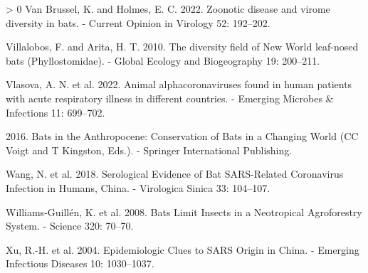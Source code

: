 \documentclass[11pt]{article}
\newlength{\cslhangindent}
\newenvironment{CSLReferences}[3] %
 {%
  \setlength{\parindent}{0pt}
  \ifodd #1 \everypar{\setlength{\hangindent}{\cslhangindent}}\ignorespaces\fi
  \ifnum #2 > 0
  \setlength{\parskip}{#2\baselineskip}
  \fi
 }%
 {}
\begin{document}
\begin{CSLReferences}{1}{0}
\leavevmode\hypertarget{ref-VanBrussel2022ZooDis}{}%
Van Brussel, K. and Holmes, E. C. 2022. Zoonotic disease and virome
diversity in bats. - Current Opinion in Virology 52: 192--202.

\leavevmode\hypertarget{ref-Villalobos2010DivFie}{}%
Villalobos, F. and Arita, H. T. 2010. The diversity field of New World
leaf-nosed bats (Phyllostomidae). - Global Ecology and Biogeography 19:
200--211.

\leavevmode\hypertarget{ref-Vlasova2022AniAlp}{}%
Vlasova, A. N. et al. 2022. Animal alphacoronaviruses found in human
patients with acute respiratory illness in different countries. -
Emerging Microbes \& Infections 11: 699--702.

\leavevmode\hypertarget{ref-Voigt2016BatAnt}{}%
2016. Bats in the Anthropocene: Conservation of Bats in a Changing World
(CC Voigt and T Kingston, Eds.). - Springer International Publishing.

\leavevmode\hypertarget{ref-Wang2018SerEvi}{}%
Wang, N. et al. 2018. Serological Evidence of Bat SARS-Related
Coronavirus Infection in Humans, China. - Virologica Sinica 33:
104--107.

\leavevmode\hypertarget{ref-Williams-Guillen2008BatLim}{}%
Williams-Guillén, K. et al. 2008. Bats Limit Insects in a Neotropical
Agroforestry System. - Science 320: 70--70.

\leavevmode\hypertarget{ref-Xu2004EpiClu}{}%
Xu, R.-H. et al. 2004. Epidemiologic Clues to SARS Origin in China. -
Emerging Infectious Diseases 10: 1030--1037.

\end{CSLReferences}
\end{document}
